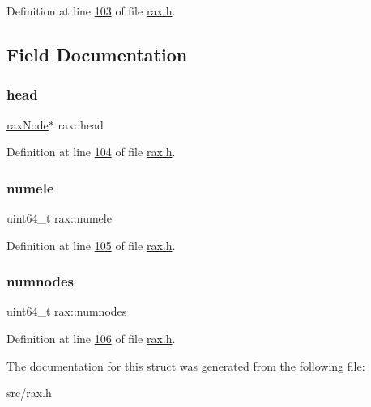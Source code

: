 Definition at line \hyperlink{rax_8h_source_l00103}{103} of file \hyperlink{rax_8h_source}{rax.\+h}.



\subsection{Field Documentation}
\mbox{\label{structrax_a9cca71d1469d2227b34f4c59103dd8ac}} 
\subsubsection{\texorpdfstring{head}{head}}
{\footnotesize\ttfamily \hyperlink{structraxNode}{rax\+Node}$\ast$ rax\+::head}



Definition at line \hyperlink{rax_8h_source_l00104}{104} of file \hyperlink{rax_8h_source}{rax.\+h}.

\mbox{\label{structrax_a46ab6cb87a05fa43ebe5b70e01198d66}} 
\subsubsection{\texorpdfstring{numele}{numele}}
{\footnotesize\ttfamily uint64\+\_\+t rax\+::numele}



Definition at line \hyperlink{rax_8h_source_l00105}{105} of file \hyperlink{rax_8h_source}{rax.\+h}.

\mbox{\label{structrax_a2ae9278812b9f5df9e689ef38a934861}} 
\subsubsection{\texorpdfstring{numnodes}{numnodes}}
{\footnotesize\ttfamily uint64\+\_\+t rax\+::numnodes}



Definition at line \hyperlink{rax_8h_source_l00106}{106} of file \hyperlink{rax_8h_source}{rax.\+h}.



The documentation for this struct was generated from the following file\+:\begin{DoxyCompactItemize}
\item 
src/rax.\+h\end{DoxyCompactItemize}
